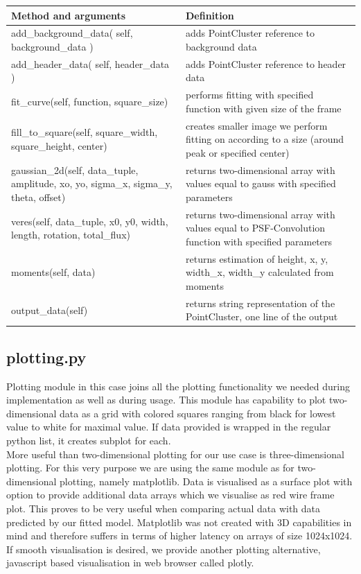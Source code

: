 \documentclass[12pt, a4paper, oneside]{book}
\begin{document}
\begin{center}
    \begin{tabular}  { | p{0.5\linewidth} | p{0.5\linewidth} | }
        \hline
        Method and arguments & Definition \\
        \hline
        add\_background\_data( self, background\_data ) & adds PointCluster reference to background data \\
        \hline
        add\_header\_data( self, header\_data ) & adds PointCluster reference to header data \\
        \hline
        fit\_curve(self, function, square\_size) & performs fitting with specified function with given size of the frame \\
        \hline
        fill\_to\_square(self, square\_width, square\_height, center) & creates smaller image we perform fitting on according to a size (around peak or specified center) \\
        \hline
        gaussian\_2d(self, data\_tuple, amplitude, xo, yo, sigma\_x, sigma\_y, theta, offset) & returns two-dimensional array with values equal to gauss with specified parameters \\
        \hline
        veres(self, data\_tuple, x0, y0, width, length, rotation, total\_flux) & returns two-dimensional array with values equal to PSF-Convolution function with specified parameters \\
        \hline
        moments(self, data) & returns estimation of height, x, y, width\_x, width\_y calculated from moments \\
        \hline
        output\_data(self) & returns string representation of the PointCluster, one line of the output \\
        \hline
    \end{tabular}
\end{center}


\subsection{plotting.py}

Plotting module in this case joins all the plotting functionality we needed during implementation as well as during usage.
This module has capability to plot two-dimensional data as a grid with colored squares ranging from black for lowest value to white for maximal value.
If data provided is wrapped in the regular python list, it creates subplot for each.
\\
More useful than two-dimensional plotting for our use case is three-dimensional plotting.
For this very purpose we are using the same module as for two-dimensional plotting, namely matplotlib.
Data is visualised as a surface plot with option to provide additional data arrays which we visualise as red wire frame plot.
This proves to be very useful when comparing actual data with data predicted by our fitted model.
Matplotlib was not created with 3D capabilities in mind and therefore suffers in terms of higher latency on arrays of size 1024x1024.
If smooth visualisation is desired, we provide another plotting alternative, javascript based visualisation in web browser called plotly.
\end{document}
